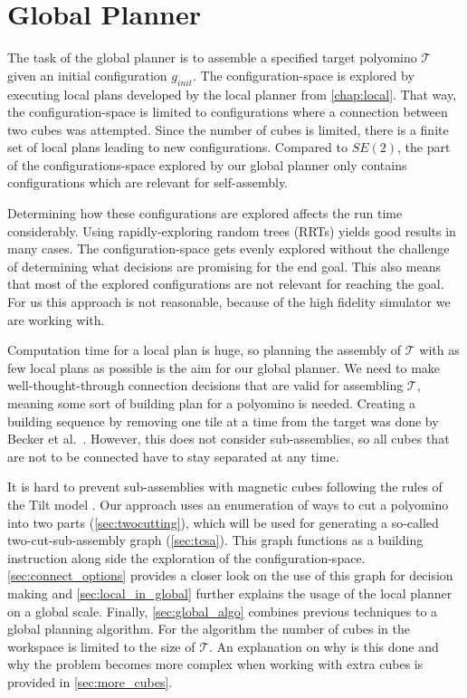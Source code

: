 \chapter{Global Planner}
\label{chap:global}

The task of the global planner is to assemble a specified target polyomino $\mathcal{T}$ given an initial configuration $g_\textit{init}$.
The configuration-space is explored by executing local plans developed by the local planner from \autoref{chap:local}.
That way, the configuration-space is limited to configurations where a connection between two cubes was attempted.
Since the number of cubes is limited, there is a finite set of local plans leading to new configurations.
Compared to $\textit{SE}(2)$, the part of the configurations-space explored by our global planner only contains configurations which are relevant for self-assembly.

Determining how these configurations are explored affects the run time considerably.
Using rapidly-exploring random trees (RRTs) \cite{lavalle1998} yields good results in many cases.
The configuration-space gets evenly explored without the challenge of determining what decisions are promising for the end goal.
This also means that most of the explored configurations are not relevant for reaching the goal.
For us this approach is not reasonable, because of the high fidelity simulator we are working with.

Computation time for a local plan is huge, so planning the assembly of $\mathcal{T}$ with as few local plans as possible is the aim for our global planner.
We need to make well-thought-through connection decisions that are valid for assembling $\mathcal{T}$, meaning some sort of building plan for a polyomino is needed.
Creating a building sequence by removing one tile at a time from the target was done by Becker et al.\ \cite{Becker2020}.
However, this does not consider sub-assemblies, so all cubes that are not to be connected have to stay separated at any time.

It is hard to prevent sub-assemblies with magnetic cubes following the rules of the Tilt model \cite{Becker2014_SP}.
Our approach uses an enumeration of ways to cut a polyomino into two parts (\autoref{sec:twocutting}), which will be used for generating a so-called two-cut-sub-assembly graph (\autoref{sec:tcsa}).
This graph functions as a building instruction along side the exploration of the configuration-space.
\autoref{sec:connect_options} provides a closer look on the use of this graph for decision making and \autoref{sec:local_in_global} further explains the usage of the local planner on a global scale. 
Finally, \autoref{sec:global_algo} combines previous techniques to a global planning algorithm.
For the algorithm the number of cubes in the workspace is limited to the size of $\mathcal{T}$.
An explanation on why is this done and why the problem becomes more complex when working with extra cubes is provided in \autoref{sec:more_cubes}.

